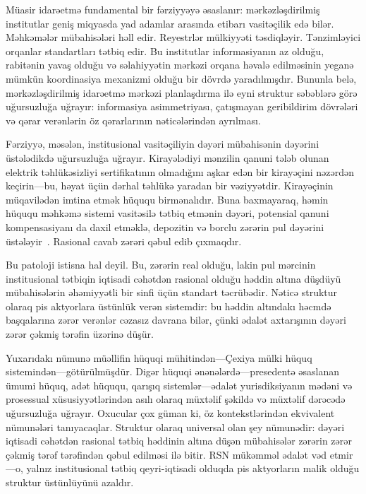 \documentclass[11pt,a4paper,twocolumn]{article}
\begin{document}
Müasir idarəetmə fundamental bir fərziyyəyə əsaslanır: mərkəzləşdirilmiş institutlar geniş miqyasda yad adamlar arasında etibarı vasitəçilik edə bilər. Məhkəmələr mübahisələri həll edir. Reyestrlər mülkiyyəti təsdiqləyir. Tənzimləyici orqanlar standartları tətbiq edir. Bu institutlar informasiyanın az olduğu, rabitənin yavaş olduğu və səlahiyyətin mərkəzi orqana həvalə edilməsinin yeganə mümkün koordinasiya mexanizmi olduğu bir dövrdə yaradılmışdır. Bununla belə, mərkəzləşdirilmiş idarəetmə mərkəzi planlaşdırma ilə eyni struktur səbəblərə görə uğursuzluğa uğrayır: informasiya asimmetriyası, çatışmayan geribildirim dövrələri və qərar verənlərin öz qərarlarının nəticələrindən ayrılması.

Fərziyyə, məsələn, institusional vasitəçiliyin dəyəri mübahisənin dəyərini üstələdikdə uğursuzluğa uğrayır. Kirayələdiyi mənzilin qanuni tələb olunan elektrik təhlükəsizliyi sertifikatının olmadığını aşkar edən bir kirayəçini nəzərdən keçirin---bu, həyat üçün dərhal təhlükə yaradan bir vəziyyətdir. Kirayəçinin müqavilədən imtina etmək hüququ birmənalıdır. Buna baxmayaraq, həmin hüququ məhkəmə sistemi vasitəsilə tətbiq etmənin dəyəri, potensial qanuni kompensasiyanı da daxil etməklə, depozitin və borclu zərərin pul dəyərini üstələyir~\cite{czcourtfees}. Rasional cavab zərəri qəbul edib çıxmaqdır.

Bu patoloji istisna hal deyil. Bu, zərərin real olduğu, lakin pul mərcinin institusional tətbiqin iqtisadi cəhətdən rasional olduğu həddin altına düşdüyü mübahisələrin əhəmiyyətli bir sinfi üçün standart təcrübədir. Nəticə struktur olaraq pis aktyorlara üstünlük verən sistemdir: bu həddin altındakı həcmdə başqalarına zərər verənlər cəzasız davrana bilər, çünki ədalət axtarışının dəyəri zərər çəkmiş tərəfin üzərinə düşür.

Yuxarıdakı nümunə müəllifin hüquqi mühitindən---Çexiya mülki hüquq sistemindən---götürülmüşdür. Digər hüquqi ənənələrdə---presedentə əsaslanan ümumi hüquq, adət hüququ, qarışıq sistemlər---ədalət yurisdiksiyanın mədəni və prosessual xüsusiyyətlərindən asılı olaraq müxtəlif şəkildə və müxtəlif dərəcədə uğursuzluğa uğrayır. Oxucular çox güman ki, öz kontekstlərindən ekvivalent nümunələri tanıyacaqlar. Struktur olaraq universal olan şey nümunədir: dəyəri iqtisadi cəhətdən rasional tətbiq həddinin altına düşən mübahisələr zərərin zərər çəkmiş tərəf tərəfindən qəbul edilməsi ilə bitir. RSN mükəmməl ədalət vəd etmir---o, yalnız institusional tətbiq qeyri-iqtisadi olduqda pis aktyorların malik olduğu struktur üstünlüyünü azaldır.
\end{document}
